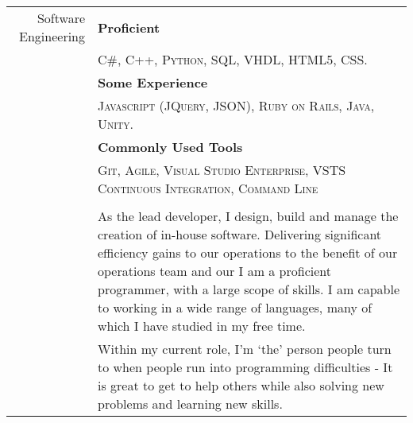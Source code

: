 \documentclass[a4paper,11pt]{article}
\begin{document}
\begin{tabular}{r|p{13cm}}
    Software Engineering  
        & \textbf{Proficient} \\
        & \footnotesize{\textsc{C\#, C++, Python, SQL, VHDL, HTML5, CSS.}} \\
        & \textbf{Some Experience} \\
        & \footnotesize{\textsc{Javascript (JQuery, JSON), Ruby on Rails, Java, Unity.}}\\
        & \textbf{Commonly Used Tools} \\
        & \footnotesize{\textsc{Git, Agile, Visual Studio Enterprise, VSTS Continuous Integration, Command Line}}\\
        & \\
        & As the lead developer, I design, build and manage the creation of in-house software. Delivering significant efficiency gains to our operations to the benefit of our operations team and our 
        I am a proficient programmer, with a large scope of skills. I am capable to working in a wide range of languages, many of which I have studied in my free time.\\
        & Within my current role, I'm `the' person people turn to when people run into programming difficulties - It is great to get to help others while also solving new problems and learning new skills. \\
        

\end{tabular}
\end{document}
